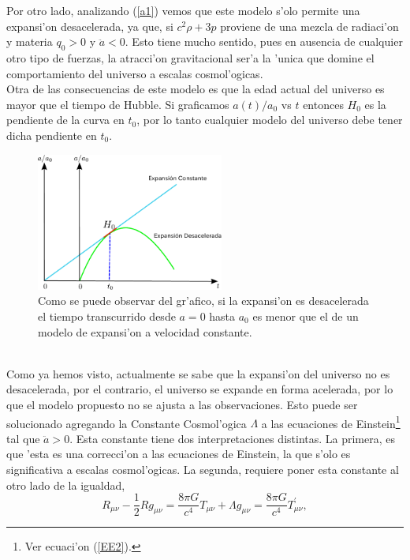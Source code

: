 Por otro lado, analizando (\ref{a1}) vemos que este modelo s'olo permite una expansi'on desacelerada, ya que, si $c^2\rho+ 3p$ proviene de una mezcla de
radiaci'on y materia $q_0>0$ y $\ddot a<0$. Esto tiene mucho sentido, pues en ausencia de cualquier otro tipo de fuerzas, la
atracci'on gravitacional ser'a la 'unica que domine el comportamiento del universo a escalas cosmol'ogicas.\\
Otra de las consecuencias de este modelo es que la edad actual del 
universo es mayor que el tiempo de Hubble. Si graficamos  $a(t)/a_0$ vs $t$ entonces $H_0$ es la pendiente de la curva en $t_0$,
por lo tanto cualquier modelo del universo debe tener dicha pendiente en $t_0$.\\
\begin{figure}[h!]
  \centering
\includegraphics[width=0.55\textwidth]{fig/ex.pdf}
 \caption{Como se puede observar del gr'afico, si la expansi'on es desacelerada el tiempo transcurrido desde $a=0$ hasta $a_0$ es menor que el de un modelo de expansi'on a velocidad constante.}
  \end{figure}\\
Como ya hemos visto, actualmente se sabe que la expansi'on del universo no es desacelerada,
por el contrario, el universo se expande en forma acelerada, por lo que el modelo propuesto no se ajusta a las observaciones.
Esto puede ser solucionado agregando la Constante Cosmol'ogica $\Lambda$ a las ecuaciones de Einstein\footnote{Ver ecuaci'on (\ref{EE2}).}
tal que $\ddot a > 0$. Esta constante tiene dos interpretaciones distintas. 
La primera, es que 'esta es una correcci'on a las ecuaciones de Einstein, la que s'olo es significativa a escalas cosmol'ogicas. 
La segunda, requiere poner esta constante al otro lado de la igualdad,
\begin{equation}
R_{\mu \nu} -\frac{1}{2}Rg_{\mu \nu} = \frac{8\pi G}{c^4}T_{\mu \nu}+ \Lambda g_{\mu \nu} = \frac{8\pi G}{c^4}T^{\prime}_{\mu \nu}, \label{TEL}
\end{equation}
